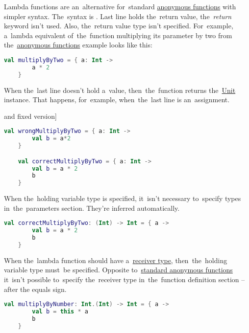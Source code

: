 \label{kotlinlambda}
Lambda functions are an~alternative for~standard \hyperref[kotlinanonymousfunction]{anonymous functions} with simpler syntax.
The~syntax is .
Last line holds the~return value, \mbox{the \textit{return}} keyword isn't used.
Also, the~return value type isn't specified.
For~example, a~lambda equivalent of~the~function multiplying its parameter by two from the~\hyperref[kotlinanonymousfunction]{anonymous functions} example looks like this:
\begin{lstlisting}[language=Kotlin]
    val multiplyByTwo = { a: Int ->
        a * 2
    }
\end{lstlisting}
\newline

\noindent When the~last line doesn't hold a~value, then~the~function returns the~\hyperref[kotlinunit]{Unit} instance.
That happens, for~example, when~the~last line is an~assignment.

\example[lambda functions wrongly returning \hyperref[kotlinunit]{Unit} and fixed version]
\begin{lstlisting}[language=Kotlin]
    val wrongMultiplyByTwo = { a: Int ->
        val b = a*2
    }

    val correctMultiplyByTwo = { a: Int ->
        val b = a * 2
        b
    }
\end{lstlisting}
\newline

\noindent When the~holding variable type is specified, it~isn't necessary to~specify types in~the~parameters section.
They're inferred automatically.

\begin{lstlisting}[language=Kotlin]
    val correctMultiplyByTwo: (Int) -> Int = { a ->
        val b = a * 2
        b
    }
\end{lstlisting}
\newline

\noindent When the~lambda function should have a~\hyperref[kotlinanonymousreceivertype]{receiver type}, then~the~holding variable type must~be specified.
Opposite to~\hyperref[kotlinanonymousfunction]{standard anonymous functions} it~isn't possible to~specify the~receiver type in~the~function definition section -- after the equals sign.

\begin{lstlisting}[language=Kotlin]
    val multiplyByNumber: Int.(Int) -> Int = { a ->
        val b = this * a
        b
    }
\end{lstlisting}
\newline

